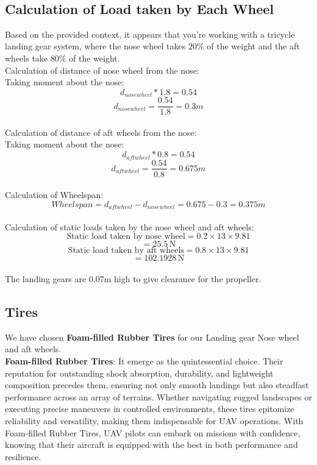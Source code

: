 \documentclass[12 pt]{article}
\begin{document}
{{\\
\subsection{Calculation of Load taken by Each Wheel}
Based on the provided context, it appears that you're working with a tricycle landing gear system, where the nose wheel takes \(20\%\) of the weight and the aft wheels take \(80\%\) of the weight. \\

Calculation of distance of nose wheel from the nose: \\
Taking moment about the nose: \\
\[d_{nose wheel} * 1.8 = 0.54 \]
\[d_{nose wheel} = \frac{0.54}{1.8} = 0.3m \] \\
Calculation of distance of aft wheels from the nose: \\
Taking moment about the nose: \\
\[d_{aft wheel} * 0.8 = 0.54 \]
\[d_{aft wheel} = \frac{0.54}{0.8} = 0.675m \] \\
Calculation of Wheelspan:
\[Wheelspan = d_{aft wheel} - d_{nose wheel} = 0.675 - 0.3 = 0.375m \] \\
Calculation of static loads taken by the nose wheel and aft wheels:
\[ \text{Static load taken by nose wheel} = 0.2 \times 13 \times 9.81 \]
\[ = 25.5 \, \text{N} \]
\[ \text{Static load taken by aft wheels} = 0.8 \times 13 \times 9.81 \]
\[ = 102.1928 \, \text{N} \] \\
The landing gears are 0.07m high to give clearance for the propeller.
\subsection{Tires}
We have chosen \textbf{Foam-filled Rubber Tires} for our Landing gear Nose wheel and aft wheels. \\
\textbf{Foam-filled Rubber Tires}: It emerge as the quintessential choice. Their reputation for outstanding shock absorption, durability, and lightweight composition precedes them, ensuring not only smooth landings but also steadfast performance across an array of terrains. Whether navigating rugged landscapes or executing precise maneuvers in controlled environments, these tires epitomize reliability and versatility, making them indispensable for UAV operations. With Foam-filled Rubber Tires, UAV pilots can embark on missions with confidence, knowing that their aircraft is equipped with the best in both performance and resilience.\\


}}
\end{document}
